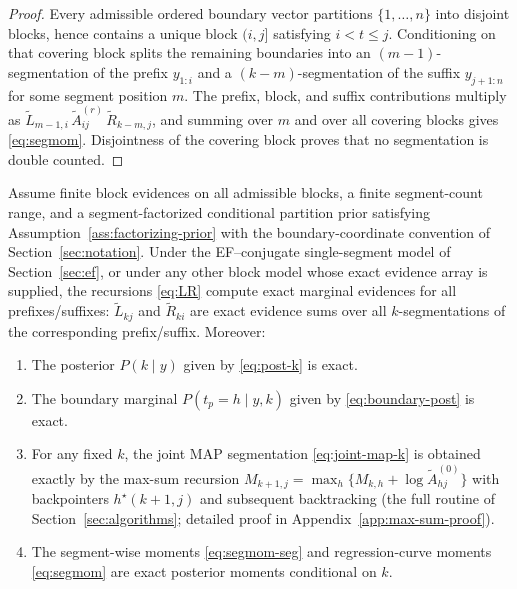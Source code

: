 \begin{proof}
Every admissible ordered boundary vector partitions $\{1,\dots,n\}$ into disjoint blocks, hence
contains a unique block $(i,j]$ satisfying $i<t\le j$. Conditioning on that covering block splits
the remaining boundaries into an $(m-1)$-segmentation of the prefix $y_{1:i}$ and a
$(k-m)$-segmentation of the suffix $y_{j+1:n}$ for some segment position $m$. The prefix, block, and
suffix contributions multiply as
$\widetilde L_{m-1,i}\,\widetilde A^{(r)}_{ij}\,\widetilde R_{k-m,j}$, and summing over $m$ and
over all covering blocks gives \eqref{eq:segmom}. Disjointness of the covering block proves that no
segmentation is double counted.
\end{proof}

\begin{theorem}
\label{thm:dp-correctness}
Assume finite block evidences on all admissible blocks, a finite segment-count range, and a
segment-factorized conditional partition prior satisfying Assumption~\ref{ass:factorizing-prior}
with the boundary-coordinate convention of Section~\ref{sec:notation}. Under the EF--conjugate
single-segment model of Section~\ref{sec:ef}, or under any other block model whose exact evidence
array is supplied, the recursions \eqref{eq:LR} compute exact marginal evidences for all
prefixes/suffixes:
$\widetilde{L}_{k j}$ and $\widetilde{R}_{k i}$ are exact evidence sums over all
$k$-segmentations of the corresponding prefix/suffix. Moreover:
\begin{enumerate}
\item The posterior $P(k\mid y)$ given by \eqref{eq:post-k} is exact.
\item The boundary marginal $P(t_p=h\mid y,k)$ given by \eqref{eq:boundary-post} is exact.
\item For any fixed $k$, the joint MAP segmentation \eqref{eq:joint-map-k} is obtained exactly by the
max-sum recursion $M_{k+1,j}=\max_h\{M_{k,h}+\log\widetilde A^{(0)}_{hj}\}$ with backpointers
$h^\star(k+1,j)$ and subsequent backtracking (the full routine of Section~\ref{sec:algorithms};
detailed proof in Appendix~\ref{app:max-sum-proof}).
\item The segment-wise moments \eqref{eq:segmom-seg} and regression-curve moments \eqref{eq:segmom}
are exact posterior moments conditional on $k$.
\end{enumerate}
\end{theorem}

